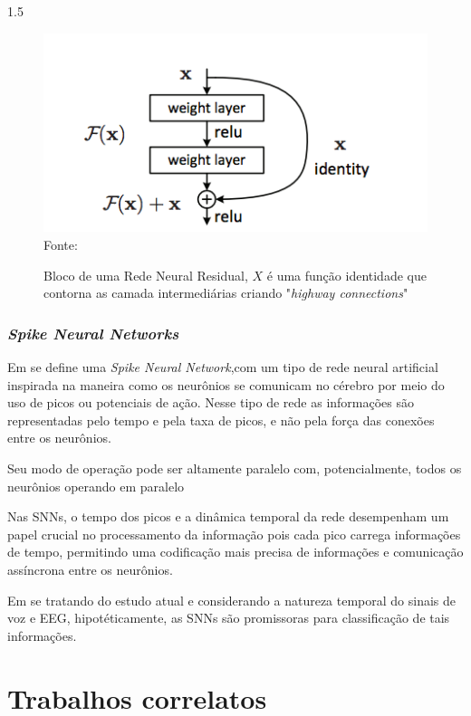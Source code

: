 \documentclass[a4paper,12pt,openright,oneside]{book}
\newenvironment{myenv}[1]
  {\begin{spacing}{#1}}
  {\end{spacing}}
\begin{document}
\begin{myenv}{1.5}
						\begin{figure}
							\centering
							\caption[bloco de uma Resnet]{Bloco de uma Rede Neural Residual, $X$ é uma função identidade que contorna as camada intermediárias criando "\textit{highway connections}"}
							\includegraphics[width=0.7\linewidth]{images/residualBlock}
							\\ Fonte: \cite{DBLP:journals/corr/HeZRS15}
							\label{fig:residualblock}
						\end{figure}
						
					\subsubsection{\textit{Spike Neural Networks}}
						\par Em \cite{kasabov2018time} se define uma \textit{Spike Neural Network},com um tipo de rede neural artificial inspirada na maneira como os neurônios se comunicam no cérebro por meio do uso de picos ou potenciais de ação. Nesse tipo de rede as informações são representadas pelo tempo e pela taxa de picos, e não pela força das conexões entre os neurônios.
						
						\par Seu modo de operação pode ser altamente paralelo com, potencialmente, todos os neurônios operando em paralelo
					
						\par Nas SNNs, o tempo dos picos e a dinâmica temporal da rede desempenham um papel crucial no processamento da informação pois cada pico carrega informações de tempo, permitindo uma codificação mais precisa de informações e comunicação assíncrona entre os neurônios.
					
						\par Em se tratando do estudo atual e considerando a natureza temporal do sinais de voz e EEG, hipotéticamente, as SNNs são promissoras para classificação de tais informações.
				
			\section{Trabalhos correlatos}
				\label{sec:trabcorrelatos}
		

\end{myenv}
\end{document}
